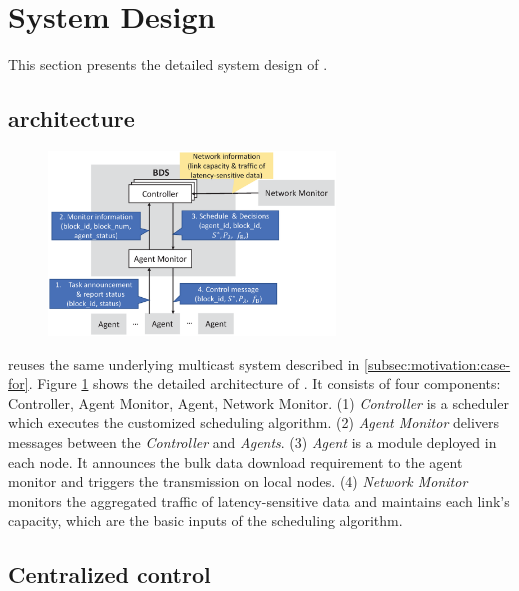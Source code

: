 \section{System Design}
\label{sec:system}

This section presents the detailed system design of \name.%

\subsection{\name architecture}
\label{subsec:system:architecture}

\begin{figure}[t]
  \centering
  \includegraphics[width=3in]{images/implementation_v2.eps}
  \label{fig:implementation}
\vspace{-0.4cm}
\end{figure}

\name reuses the same underlying multicast system described in \Section\ref{subsec:motivation:case-for}. Figure \ref{fig:implementation} shows the detailed architecture of \name. It consists of four components: Controller, Agent Monitor, Agent, Network Monitor. (1) \emph{Controller} is a scheduler which executes the customized scheduling algorithm. (2) \emph{Agent Monitor} delivers messages between the \emph{Controller} and \emph{Agents}. (3) \emph{Agent} is a module deployed in each node. It announces the bulk data download requirement to the agent monitor and triggers the transmission on local nodes. (4) \emph{Network Monitor} monitors the aggregated traffic of latency-sensitive data and maintains each link's capacity, which are the basic inputs of the scheduling algorithm.

\subsection{Centralized control}
\label{subsec:system:centralized}


